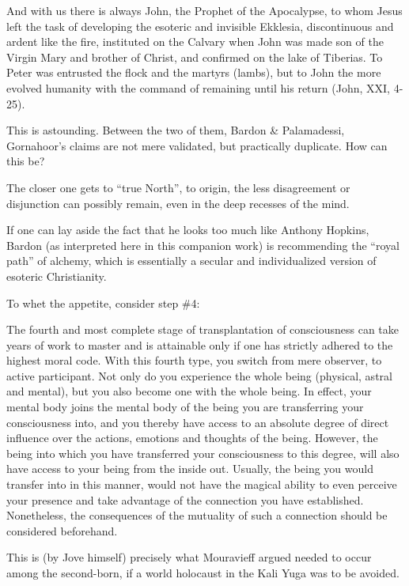\begin{quotex}
And with us there is always John, the Prophet of the Apocalypse, to whom Jesus left the task of developing the esoteric and invisible Ekklesia, discontinuous and ardent like the fire, instituted on the Calvary when John was made son of the Virgin Mary and brother of Christ, and confirmed on the lake of Tiberias. To Peter was entrusted the flock and the martyrs (lambs), but to John the more evolved humanity with the command of remaining until his return (John, XXI, 4-25).
\end{quotex}


This is astounding. Between the two of them, Bardon \& Palamadessi, Gornahoor's claims are not mere validated, but practically duplicate. How can this be?

The closer one gets to ``true North'', to origin, the less disagreement or disjunction can possibly remain, even in the deep recesses of the mind.

If one can lay aside the fact that he looks too much like Anthony Hopkins, Bardon (as interpreted here in this companion work) is recommending the ``royal path'' of alchemy, which is essentially a secular and individualized version of esoteric Christianity.

To whet the appetite, consider step \#4:


\begin{quotex}
The fourth and most complete stage of transplantation of consciousness can take years of work to master and is attainable only if one has strictly adhered to the highest moral code. With this fourth type, you switch from mere observer, to active participant. Not only do you experience the whole being (physical, astral and mental), but you also become one with the whole being. In effect, your mental body joins the mental body of the being you are transferring your consciousness into, and you thereby have access to an absolute degree of direct influence over the actions, emotions and thoughts of the being. However, the being into which you have transferred your consciousness to this degree, will also have access to your being from the inside out. Usually, the being you would transfer into in this manner, would not have the magical ability to even perceive your presence and take advantage of the connection you have established. Nonetheless, the consequences of the mutuality of such a connection should be considered beforehand.
\end{quotex}


This is (by Jove himself) precisely what Mouravieff argued needed to occur among the second-born, if a world holocaust in the Kali Yuga was to be avoided.

